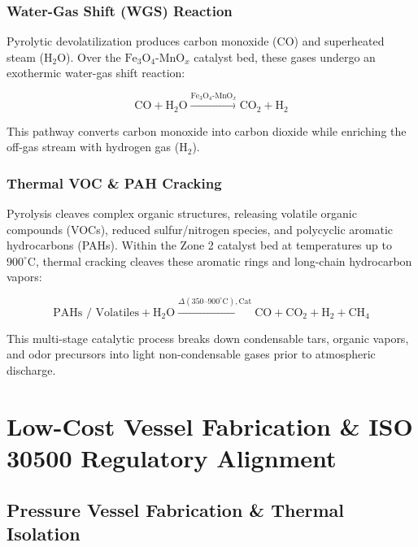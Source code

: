 \documentclass[10pt,twocolumn,a4paper]{article}
\begin{document}
\subsubsection*{Water-Gas Shift (WGS) Reaction}

Pyrolytic devolatilization produces carbon monoxide ($\text{CO}$) and superheated steam ($\text{H}_2\text{O}$). Over the $\text{Fe}_3\text{O}_4\text{-MnO}_x$ catalyst bed, these gases undergo an exothermic water-gas shift reaction:

\begin{equation}
\text{CO} + \text{H}_2\text{O} \xrightarrow{\text{Fe}_3\text{O}_4\text{-MnO}_x} \text{CO}_2 + \text{H}_2
\end{equation}

This pathway converts carbon monoxide into carbon dioxide while enriching the off-gas stream with hydrogen gas ($\text{H}_2$).

\subsubsection*{Thermal VOC \& PAH Cracking}

Pyrolysis cleaves complex organic structures, releasing volatile organic compounds (VOCs), reduced sulfur/nitrogen species, and polycyclic aromatic hydrocarbons (PAHs). Within the Zone 2 catalyst bed at temperatures up to $900^\circ\text{C}$, thermal cracking cleaves these aromatic rings and long-chain hydrocarbon vapors:

\begin{equation}
\text{PAHs / Volatiles} + \text{H}_2\text{O} \xrightarrow{\Delta (350\text{--}900^\circ\text{C}), \text{Cat}} \text{CO} + \text{CO}_2 + \text{H}_2 + \text{CH}_4
\end{equation}

This multi-stage catalytic process breaks down condensable tars, organic vapors, and odor precursors into light non-condensable gases prior to atmospheric discharge.

\section{Low-Cost Vessel Fabrication \& ISO 30500 Regulatory Alignment}

\subsection{Pressure Vessel Fabrication \& Thermal Isolation}
\end{document}
